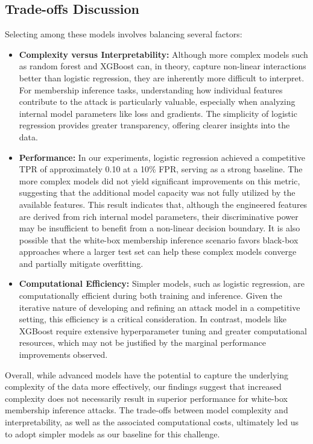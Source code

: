 \documentclass[12pt]{article}
\begin{document}
\subsection{Trade-offs Discussion}
Selecting among these models involves balancing several factors:
\begin{itemize}
    \item \textbf{Complexity versus Interpretability:}  
    Although more complex models such as random forest and XGBoost can, in theory, capture non-linear interactions better than logistic regression, they are inherently more difficult to interpret. For membership inference tasks, understanding how individual features contribute to the attack is particularly valuable, especially when analyzing internal model parameters like loss and gradients. The simplicity of logistic regression provides greater transparency, offering clearer insights into the data.

    \item \textbf{Performance:}  
    In our experiments, logistic regression achieved a competitive TPR of approximately 0.10 at a 10\% FPR, serving as a strong baseline. The more complex models did not yield significant improvements on this metric, suggesting that the additional model capacity was not fully utilized by the available features. This result indicates that, although the engineered features are derived from rich internal model parameters, their discriminative power may be insufficient to benefit from a non-linear decision boundary. It is also possible that the white-box membership inference scenario favors black-box approaches where a larger test set can help these complex models converge and partially mitigate overfitting.

    \item \textbf{Computational Efficiency:}  
    Simpler models, such as logistic regression, are computationally efficient during both training and inference. Given the iterative nature of developing and refining an attack model in a competitive setting, this efficiency is a critical consideration. In contrast, models like XGBoost require extensive hyperparameter tuning and greater computational resources, which may not be justified by the marginal performance improvements observed.
\end{itemize}

Overall, while advanced models have the potential to capture the underlying complexity of the data more effectively, our findings suggest that increased complexity does not necessarily result in superior performance for white-box membership inference attacks. The trade-offs between model complexity and interpretability, as well as the associated computational costs, ultimately led us to adopt simpler models as our baseline for this challenge.
\end{document}

